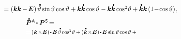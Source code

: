 \begin{otherlanguage}{russian}
\begin{fleqn}[0pt]
\begin{multline*}
%
\shoveright{\hfill \hspace{4.8em} \scalebox{0.94}[0.96]{$= \left( \hspace{0.1ex} \bm{k} \bm{k} \hspace{-0.1ex} - \hspace{-0.2ex} \bm{E} \hspace{0.1ex} \right) \hspace{-0.1ex} \mathdotabove{\vartheta} \operatorname{sin} \vartheta \operatorname{cos} \vartheta \hspace{0.1ex}
+ \bm{k} \mathdotabove{\bm{k}} \operatorname{cos} \vartheta
- \bm{k} \mathdotabove{\bm{k}} \operatorname{cos}^{2\hspace{-0.4ex}} \vartheta
+ \mathdotabove{\bm{k}} \bm{k} \left({1 \!-\! \operatorname{cos} \vartheta}\right) \hspace{-0.16ex},$}}
\end{multline*}
\begin{multline*}
\shoveleft{\scalebox{0.94}[0.96]{$\mathdotabove{\bm{P}}^{\mathsf{\hspace{0.12ex}A}} \hspace{-0.2ex}\dotp \bm{P}^{\mathsf{\hspace{0.12ex}S}} \hspace{-0.25ex} = $} \hfill} \\[-0.25em]
%
\shoveleft{\scalebox{0.8}[0.82]{$= ( \hspace{0.12ex} \bm{k} \hspace{-0.24ex}\times\hspace{-0.4ex} \bm{E} \hspace{0.1ex} ) \hspace{-0.2ex} \dotp \hspace{-0.2ex} \bm{E} \hspace{0.4ex} \mathdotabove{\vartheta} \operatorname{cos}^{2\hspace{-0.4ex}} \vartheta +
( \hspace{0.12ex} \mathdotabove{\bm{k}} \hspace{-0.24ex}\times\hspace{-0.4ex} \bm{E} \hspace{0.1ex} ) \hspace{-0.2ex} \dotp \hspace{-0.2ex} \bm{E} \hspace{0.1ex} \operatorname{sin} \vartheta \operatorname{cos} \vartheta \:+$} \hfill} \\[-0.2em]

\end{multline*}
\end{fleqn}
\end{otherlanguage}
